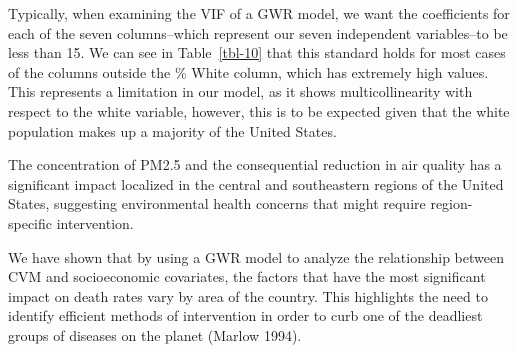 \documentclass[
]{article}
\begin{document}
\begin{table}

\caption{\label{tbl-10}}


\end{table}%

Typically, when examining the VIF of a GWR model, we want the
coefficients for each of the seven columns--which represent our seven
independent variables--to be less than 15. We can see in
Table~\ref{tbl-10} that this standard holds for most cases of the
columns outside the \% White column, which has extremely high values.
This represents a limitation in our model, as it shows multicollinearity
with respect to the white variable, however, this is to be expected
given that the white population makes up a majority of the United
States.

The concentration of PM2.5 and the consequential reduction in air
quality has a significant impact localized in the central and
southeastern regions of the United States, suggesting environmental
health concerns that might require region-specific intervention.~

We have shown that by using a GWR model to analyze the relationship
between CVM and socioeconomic covariates, the factors that have the most
significant impact on death rates vary by area of the country. This
highlights the need to identify efficient methods of intervention in
order to curb one of the deadliest groups of diseases on the planet
(Marlow 1994).
\end{document}
